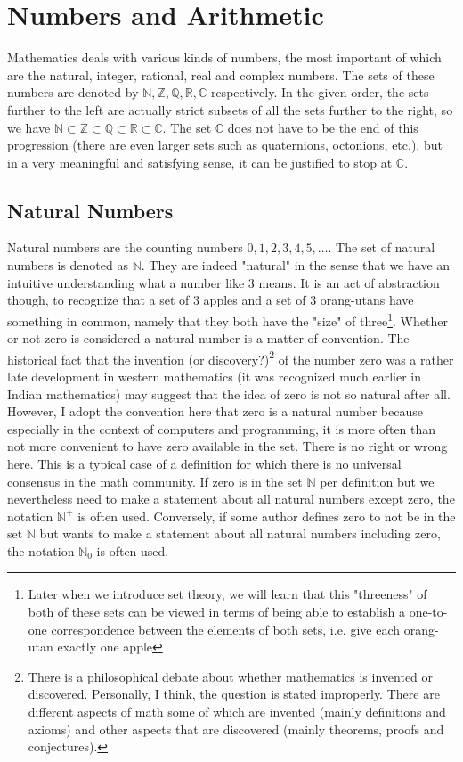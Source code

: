 \section{Numbers and Arithmetic} 

Mathematics deals with various kinds of numbers, the most important of which are the natural, integer, rational, real and complex numbers. The sets of these numbers are denoted by  $\mathbb{N,Z,Q,R,C}$ respectively. In the given order, the sets further to the left are actually strict subsets of all the sets further to the right, so we have $\mathbb{N \subset Z \subset Q \subset R \subset C}$. The set $\mathbb{C}$ does not have to be the end of this progression (there are even larger sets such as quaternions, octonions, etc.), but in a very meaningful and satisfying sense, it can be justified to stop at $\mathbb{C}$.

\subsection{Natural Numbers}
Natural numbers are the counting numbers $0,1,2,3,4,5,\ldots$. The set of natural numbers is denoted as $\mathbb{N}$. They are indeed "natural" in the sense that we have an intuitive understanding what a number like $3$ means. It is an act of abstraction though, to recognize that a set of 3 apples and a set of 3 orang-utans have something in common, namely that they both have the "size" of three\footnote{Later when we introduce set theory, we will learn that this "threeness" of both of these sets can be viewed in terms of being able to establish a one-to-one correspondence between the elements of both sets, i.e. give each orang-utan exactly one apple}. Whether or not zero is considered a natural number is a matter of convention. The historical fact that the invention (or discovery?)\footnote{There is a philosophical debate about whether mathematics is invented or discovered. Personally, I think, the question is stated improperly. There are different aspects of math some of which are invented (mainly definitions and axioms) and other aspects that are discovered (mainly theorems, proofs and conjectures).} of the number zero was a rather late development in western mathematics (it was recognized much earlier in Indian mathematics) may suggest that the idea of zero is not so natural after all. However, I adopt the convention here that zero is a natural number because especially in the context of computers and programming, it is more often than not more convenient to have zero available in the set. There is no right or wrong here. This is a typical case of a definition for which there is no universal consensus in the math community. If zero is in the set $\mathbb{N}$ per definition but we nevertheless need to make a statement about all natural numbers except zero, the notation $\mathbb{N}^+$ is often used. Conversely, if some author defines zero to not be in the set $\mathbb{N}$ but wants to make a statement about all natural numbers including zero, the notation $\mathbb{N}_0$ is often used.

